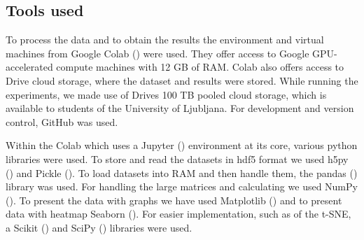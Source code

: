 \subsection{Tools used}

To process the data and to obtain the results the environment and virtual machines from Google Colab (\cite{colab}) were used.
They offer access to Google GPU-accelerated compute machines with 12 GB of RAM. 
Colab also offers access to Drive cloud storage, where the dataset and results were stored.
While running the experiments, we made use of Drives 100 TB pooled cloud storage, which is available to students of the University of Ljubljana. 
For development and version control, GitHub was used. 

Within the Colab which uses a Jupyter (\cite{jupyter}) environment at its core, various python libraries were used.
To store and read the datasets in hdf5 format we used h5py  (\cite{hdf5}) and Pickle  (\cite{pickle}).
To load datasets into RAM and then handle them, the pandas  (\cite{pandas}) library was used.
For handling the large matrices and calculating we used NumPy  (\cite{numpy}).
To present the data with graphs we have used Matplotlib  (\cite{matplotlib}) and to present data with heatmap Seaborn  (\cite{seaborn}).
For easier implementation, such as of the t-SNE, a Scikit  (\cite{scikit}) and SciPy  (\cite{scipy}) libraries were used.
